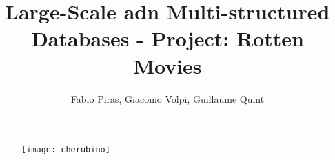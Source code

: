 

\author{Fabio Piras, Giacomo Volpi, Guillaume Quint}
\title{Large-Scale adn Multi-structured Databases - Project: Rotten Movies}
\date{}

\begin{figure}
\centering
\texttt{[image: cherubino]}

\end{figure}

\maketitle


\newpage

\tableofcontents








